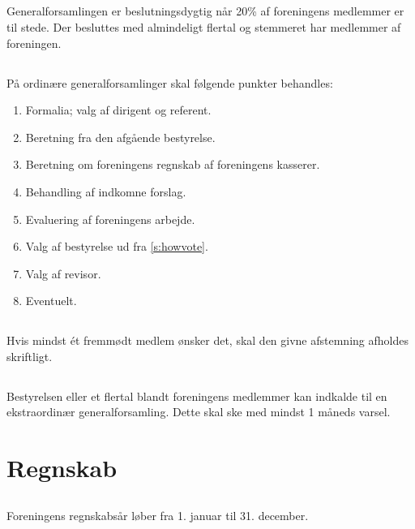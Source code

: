 \documentclass[danish,a4paper,twocolumn,oneside,article]{memoir}
\begin{document}
\section{} Generalforsamlingen er beslutningsdygtig når 20\% af foreningens medlemmer er til stede. Der
besluttes med almindeligt flertal og stemmeret har medlemmer af foreningen.

\section{} På ordinære generalforsamlinger skal følgende punkter behandles:

\begin{enumerate}
\item Formalia; valg af dirigent og referent.
\item Beretning fra den afgående bestyrelse.
\item Beretning om foreningens regnskab af foreningens kasserer.
\item Behandling af indkomne forslag.
\item Evaluering af foreningens arbejde.
\item Valg af bestyrelse ud fra \ref{s:howvote}.
\item Valg af revisor.
\item Eventuelt.
\end{enumerate}

\section{} Hvis mindst ét fremmødt medlem ønsker det, skal den givne afstemning afholdes skriftligt.

\section{} Bestyrelsen eller et flertal blandt foreningens medlemmer kan indkalde til en ekstraordinær
generalforsamling. Dette skal ske med mindst 1 måneds varsel.


\chapter{Regnskab}

\section{} Foreningens regnskabsår løber fra 1. januar til 31. december.
\end{document}
